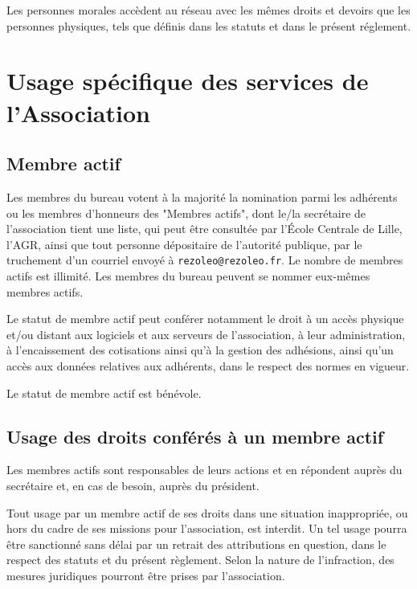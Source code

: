 \documentclass[12pt, a4paper]{article}
\begin{document}
	\bigskip

	Les personnes morales accèdent au réseau avec les mêmes droits et devoirs que
	les personnes physiques, tels que définis dans les statuts et dans le présent réglement.

	\section{Usage spécifique des services de l'Association}

	\subsection{Membre actif}

	Les membres du bureau votent à la majorité la nomination parmi les adhérents
	ou les membres d'honneurs des "Membres actifs", dont le/la secrétaire
	de l'association tient une liste, qui peut être consultée par l'École Centrale
	de Lille, l'AGR, ainsi que tout personne dépositaire de l'autorité publique,
	par le truchement d'un courriel envoyé à \nolinkurl{rezoleo@rezoleo.fr}. Le nombre de membres
	actifs est illimité. Les membres du bureau peuvent se nommer eux-mêmes membres
	actifs.

	\bigskip

	Le statut de membre actif peut conférer notamment le droit à un accès physique
	et/ou distant aux logiciels et aux serveurs de l'association, à leur
	administration, à l'encaissement des cotisations ainsi qu'à la gestion des adhésions,
	ainsi qu'un accès aux données relatives aux adhérents, dans le respect des normes
	en vigueur.

	\bigskip

	Le statut de membre actif est bénévole.

	\subsection{Usage des droits conférés à un membre actif}

	Les membres actifs sont responsables de leurs actions et en répondent auprès du
	secrétaire et, en cas de besoin, auprès du président.

	\bigskip

	Tout usage par un membre actif de ses droits dans une situation inappropriée,
	ou hors du cadre de ses missions pour l'association, est interdit. Un tel
	usage pourra être sanctionné sans délai par un retrait des attributions en
	question, dans le respect des statuts et du présent règlement. Selon la nature
	de l'infraction, des mesures juridiques pourront être prises par l'association.
\end{document}

